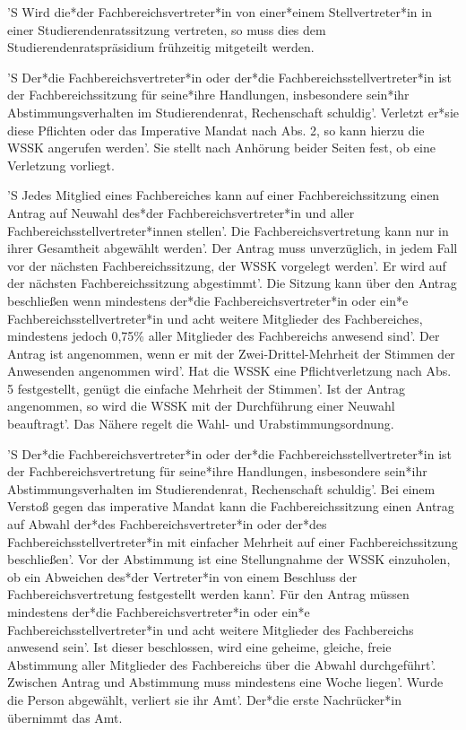 \documentclass[fontsize=12pt,parskip=half]{scrartcl}
\begin{document}
\begin{contract}
  'S Wird die*der Fachbereichsvertreter*in von einer*einem Stellvertreter*in in
  einer Studierendenratssitzung vertreten, so muss dies dem
  Studierendenratspräsidium frühzeitig mitgeteilt werden.

  'S Der*die Fachbereichsvertreter*in oder der*die Fachbereichsstellvertreter*in
  ist der Fachbereichssitzung für seine*ihre Handlungen, insbesondere sein*ihr
  Abstimmungsverhalten im Studierendenrat, Rechenschaft schuldig'. Verletzt
  er*sie diese Pflichten oder das Imperative Mandat nach Abs. 2, so kann hierzu
  die WSSK angerufen werden'. Sie stellt nach Anhörung beider Seiten fest, ob
  eine Verletzung vorliegt.

  'S Jedes Mitglied eines Fachbereiches kann auf einer Fachbereichssitzung einen
  Antrag auf Neuwahl des*der Fachbereichsvertreter*in und aller
  Fachbereichsstellvertreter*innen stellen'. Die Fachbereichsvertretung kann nur
  in ihrer Gesamtheit abgewählt werden'. Der Antrag muss unverzüglich, in jedem
  Fall vor der nächsten Fachbereichssitzung, der WSSK vorgelegt werden'. Er wird
  auf der nächsten Fachbereichssitzung abgestimmt'. Die Sitzung kann über den
  Antrag beschließen wenn mindestens der*die Fachbereichsvertreter*in oder ein*e
  Fachbereichsstellvertreter*in und acht weitere Mitglieder des Fachbereiches,
  mindestens jedoch 0,75\% aller Mitglieder des Fachbereichs anwesend sind'. Der
  Antrag ist angenommen, wenn er mit der Zwei-Drittel-Mehrheit der Stimmen der
  Anwesenden angenommen wird'. Hat die WSSK eine Pflichtverletzung nach Abs. 5
  festgestellt, genügt die einfache Mehrheit der Stimmen'. Ist der Antrag
  angenommen, so wird die WSSK mit der Durchführung einer Neuwahl beauftragt'.
  Das Nähere regelt die Wahl- und Urabstimmungsordnung.

  'S Der*die Fachbereichsvertreter*in oder der*die Fachbereichsstellvertreter*in
  ist der Fachbereichsvertretung für seine*ihre Handlungen, insbesondere
  sein*ihr Abstimmungsverhalten im Studierendenrat, Rechenschaft schuldig'. Bei
  einem Verstoß gegen das imperative Mandat kann die Fachbereichssitzung einen
  Antrag auf Abwahl der*des Fachbereichsvertreter*in oder der*des
  Fachbereichsstellvertreter*in mit einfacher Mehrheit auf einer
  Fachbereichssitzung beschließen'. Vor der Abstimmung ist eine Stellungnahme der
  WSSK einzuholen, ob ein Abweichen des*der Vertreter*in von einem Beschluss der
  Fachbereichsvertretung festgestellt werden kann'. Für den Antrag müssen
  mindestens der*die Fachbereichsvertreter*in oder ein*e
  Fachbereichsstellvertreter*in und acht weitere Mitglieder des Fachbereichs
  anwesend sein'. Ist dieser beschlossen, wird eine geheime, gleiche, freie
  Abstimmung aller Mitglieder des Fachbereichs über die Abwahl durchgeführt'.
  Zwischen Antrag und Abstimmung muss mindestens eine Woche liegen'. Wurde die
  Person abgewählt, verliert sie ihr Amt'. Der*die erste Nachrücker*in übernimmt
  das Amt.

\end{contract}
\end{document}
